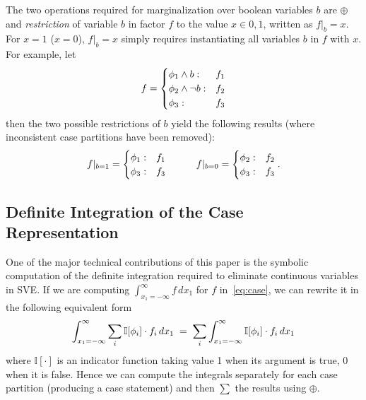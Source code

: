 \documentclass[letterpaper]{article}
\newcommand{\I}{\mathbb{I}}
\begin{document}
{%
The two operations required for marginalization over boolean variables
$b$ are $\oplus$ and \emph{restriction} of variable $b$ in factor $f$
to the value $x \in {0,1}$, written as $f|_b=x$.
For $x = 1$ ($x = 0$), $f|_b=x$ simply requires instantiating all
variables $b$ in $f$ with $x$.  For example, let
\vspace{-1mm}
\begin{align*}
f = \begin{cases}
    \phi_1 \land b: & f_1 \\ 
    \phi_2 \land \neg b: & f_2 \\ 
    \phi_3 : & f_3 \\ 
  \end{cases}
  \vspace{-3mm}
\end{align*}
then the two possible restrictions of $b$ yield the following 
results (where inconsistent case partitions have been removed):
\vspace{-4mm}
\begin{align*}
f|_{b=1} = \begin{cases}
    \phi_1: & f_1 \\ 
    \phi_3: & f_3 \\ 
  \end{cases}
\hspace{10mm}
f|_{b=0} = \begin{cases}
    \phi_2: & f_2 \\ 
    \phi_3: & f_3 \\ 
  \end{cases}.
  \vspace{-4mm}
\end{align*}

\subsection{Definite Integration of the Case Representation}

\label{sec:def_int}

One of the major technical contributions of this paper is the symbolic
computation of the definite integration required to eliminate
continuous variables in SVE.  If we are 
computing $\int_{x_1=-\infty}^{\infty} f \, dx_1$ for $f$ 
in~\eqref{eq:case}, we can rewrite it in the following equivalent form
\vspace{-2mm}
{\footnotesize
\begin{equation}
\int_{x_1=-\infty}^{\infty} \sum_i \I[\phi_i] \cdot f_i \, dx_1 \; = \; \sum_i \int_{x_1=-\infty}^{\infty} \I[\phi_i] \cdot f_i \, dx_1 \label{eq:int_decomp}
\vspace{-1mm}
\end{equation}
}
where $\I[\cdot]$ is an indicator function taking value 1 when
its argument is true, 0 when it is false.  Hence we can compute
the integrals separately for each case partition (producing a 
case statement) and then $\sum$ the results using $\oplus$.

}
\end{document}
